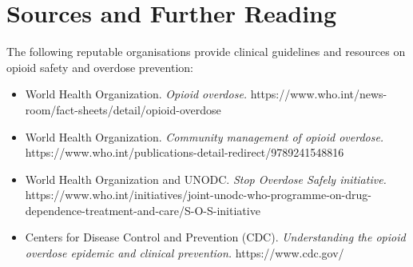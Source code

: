 \section*{Sources and Further Reading}
The following reputable organisations provide clinical guidelines and resources on opioid safety and overdose prevention:
\begin{itemize}
    \item World Health Organization. \textit{Opioid overdose.} https://www.who.int/news-room/fact-sheets/detail/opioid-overdose
    \item World Health Organization. \textit{Community management of opioid overdose.} https://www.who.int/publications-detail-redirect/9789241548816
    \item World Health Organization and UNODC. \textit{Stop Overdose Safely initiative.} https://www.who.int/initiatives/joint-unodc-who-programme-on-drug-dependence-treatment-and-care/S-O-S-initiative
    \item Centers for Disease Control and Prevention (CDC). \textit{Understanding the opioid overdose epidemic and clinical prevention.} https://www.cdc.gov/
\end{itemize}

\clearpage
